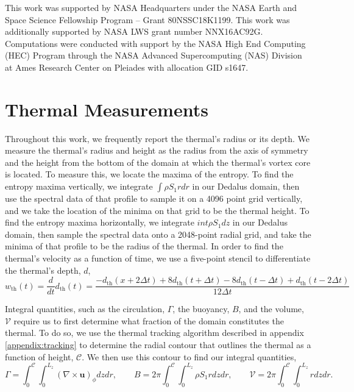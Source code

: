 \documentclass[twocolumn, amsmath, amsfonts, amssymb, trackchanges]{aastex62}
\newcommand{\grad}{\ensuremath{\nabla}}
\begin{document}
\begin{acknowledgements}
This work was supported by NASA Headquarters under the NASA Earth and Space Science Fellowship Program -- Grant 80NSSC18K1199.
This work was additionally supported by  NASA LWS grant number NNX16AC92G.  
Computations were conducted with support by the NASA High End Computing (HEC) Program through the NASA  Advanced Supercomputing (NAS) Division at Ames Research Center on Pleiades with allocation GID s1647.
\end{acknowledgements}

\appendix
\section{Thermal Measurements}
\label{appendix:measurements}
Throughout this work, we frequently report the thermal's radius or its depth.
We measure the thermal's radius and height as the radius from the axis of symmetry and the height from the bottom of the domain at which the thermal's vortex core is located.
To measure this, we locate the maxima of the entropy.
To find the entropy maxima vertically, we integrate $\int\rho S_1 r dr$ in our Dedalus domain, then use the spectral data of that profile to sample it on a 4096 point grid vertically, and we take the location of the minima on that grid to be the thermal height.
To find the entropy maxima horizontally, we integrate $int \rho S_1 dz$ in our Dedalus domain, then sample the spectral data onto a 2048-point radial grid, and take the minima of that profile to be the radius of the thermal.
In order to find the thermal's velocity as a function of time, we use a five-point stencil to differentiate the thermal's depth, $d$,
$$
w_{\text{th}}(t) = \frac{d }{dt}d_{\text{th}}(t) = \frac{-d_{\text{th}}(x + 2\Delta t) + 8d_{\text{th}}(t + \Delta t) - 8 d_{\text{th}}(t - \Delta t) + d_{\text{th}}(t - 2\Delta t)}{12\Delta t}
$$

Integral quantities, such as the circulation, $\Gamma$, the buoyancy, $B$, and the volume, $\mathcal{V}$ require us to first determine what fraction of the domain constitutes the thermal.
To do so, we use the thermal tracking algorithm described in appendix \ref{appendix:tracking} to determine the radial contour that outlines the thermal as a function of height, $\mathcal{C}$.
We then use this contour to find our integral quantities,
\begin{equation}
\Gamma = \int_0^{\mathcal{C}}\int_0^{L_z} (\grad\times\bm{u})_\phi dz dr, \qquad
B      = 2\pi \int_0^{\mathcal{C}}\int_0^{L_z} \rho S_1 r dz dr, \qquad
\mathcal{V} = 2\pi \int_0^{\mathcal{C}}\int_0^{L_z}r dz dr.
\end{equation}
\end{document}
